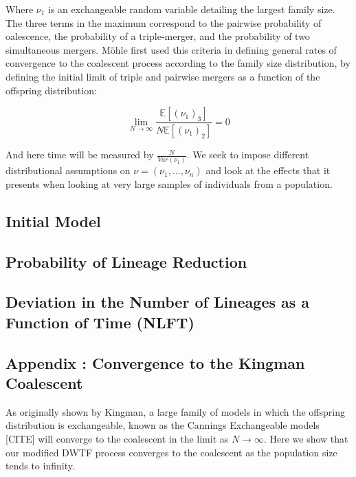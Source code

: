\documentclass[11pt]{article}
\begin{document}
Where $\nu_1$ is an exchangeable random variable detailing the largest family size. The three terms in the maximum correspond to the pairwise probability of oalescence, the probability of a triple-merger, and the probability of two simultaneous mergers. M\"{o}hle \cite{Mohle2000} first used this criteria in defining general rates of convergence to the coalescent process according to the family size distribution, by defining the initial limit of triple and pairwise mergers as a function of the offspring distribution: 

\begin{equation}
	\lim_{N \rightarrow \infty} \frac{\mathbb{E}[(\nu_1)_3]}{N \mathbb{E}[(\nu_1)_2]} = 0
\end{equation}

And here time will be measured by $\frac{N}{Var(\nu_1)}$. We seek to impose different distributional assumptions on  $\nu = (\nu_1, ...,\nu_n)$ and look at the effects that it presents when looking at very large samples of individuals from a population. 

\subsection{Initial Model}


\subsection{Probability of Lineage Reduction}





\subsection{Deviation in the Number of Lineages as a Function of Time (NLFT)}







{}



\subsection{Appendix :  Convergence to the Kingman Coalescent}

As originally shown by Kingman, a large family of models in which the offspring distribution is exchangeable, known as the Cannings Exchangeable models [CITE] will converge to the coalescent in the limit as $N \rightarrow \infty$. Here we show that our modified DWTF process converges to the coalescent as the population size tends to infinity.
\end{document}
